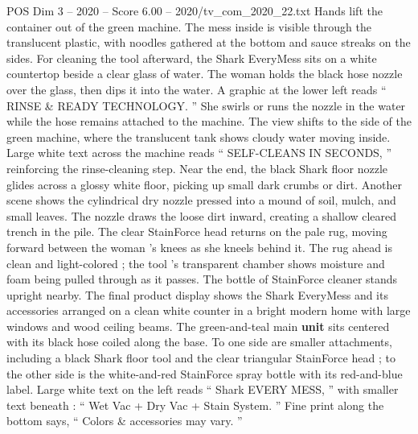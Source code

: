 \begin{textsample}{POS Dim 3 – 2020 – Score 6.00 – 2020/tv\_com\_2020\_22.txt}
Hands lift the container out of the green machine.
The mess inside is visible through the translucent plastic, with noodles gathered at the bottom and sauce streaks on the sides.
For cleaning the tool afterward, the Shark EveryMess sits on a white countertop beside a clear glass of water.
The woman holds the black hose nozzle over the glass, then dips it into the water.
A graphic at the lower left reads “ RINSE \& READY TECHNOLOGY. ” She swirls or runs the nozzle in the water while the hose remains attached to the machine.
The view shifts to the side of the green machine, where the translucent tank shows cloudy water moving inside.
Large white text across the machine reads “ SELF-CLEANS IN SECONDS, ” reinforcing the rinse-cleaning step.
Near the end, the black Shark floor nozzle glides across a glossy white floor, picking up small dark crumbs or dirt.
Another scene shows the cylindrical dry nozzle pressed into a mound of soil, mulch, and small leaves.
The nozzle draws the loose dirt inward, creating a shallow cleared trench in the pile.
The clear StainForce head returns on the pale rug, moving forward between the woman ’s knees as she kneels behind it.
The rug ahead is clean and light-colored ; the tool ’s transparent chamber shows moisture and foam being pulled through as it passes.
The bottle of StainForce cleaner stands upright nearby.
The final product display shows the Shark EveryMess and its accessories arranged on a clean white counter in a bright modern home with large windows and wood ceiling beams.
The green-and-teal main \textbf{unit} sits centered with its black hose coiled along the base.
To one side are smaller attachments, including a black Shark floor tool and the clear triangular StainForce head ; to the other side is the white-and-red StainForce spray bottle with its red-and-blue label.
Large white text on the left reads “ Shark EVERY MESS, ” with smaller text beneath : “ Wet Vac + Dry Vac + Stain System. ” Fine print along the bottom says, “ Colors \& accessories may vary. ”

\end{textsample}
